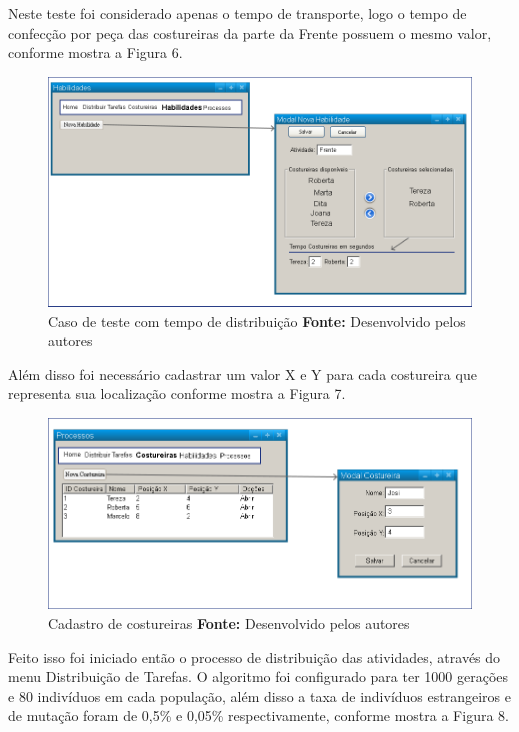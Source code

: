 \par Neste teste foi considerado apenas o tempo de transporte, logo o tempo de confecção por peça das costureiras da parte 
da Frente possuem o mesmo valor, conforme mostra a Figura 6.


\begin{figure}[h!]
	\centerline{\includegraphics[scale=0.3]{./imagens/test_case_2_habilidades.png}}
	\caption[Caso de teste tempo]
	{Caso de teste com tempo de distribuição \textbf{Fonte:} Desenvolvido pelos autores}
	\label{fig:exemplo1}
\end{figure}

\newpage

\par Além disso foi necessário cadastrar um valor X e Y para cada costureira que representa sua localização conforme 
mostra a Figura 7.


\begin{figure}[h!]
	\centerline{\includegraphics[scale=0.3]{./imagens/test_case_2_costureiras.png}}
	\caption[Caso de teste tempo Costureira]
	{Cadastro de costureiras \textbf{Fonte:} Desenvolvido pelos autores}
	\label{fig:exemplo1}
\end{figure}

\par \par Feito isso foi iniciado então o processo de distribuição das atividades, através do menu Distribuição de Tarefas.
O algoritmo foi configurado para ter 1000 gerações e 80 indivíduos em cada população, além disso a taxa de indivíduos
estrangeiros e de mutação foram de 0,5\% e 0,05\% respectivamente, conforme
mostra a Figura 8.


